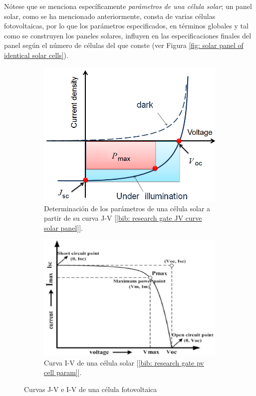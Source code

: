 \documentclass[12pt]{article}
\begin{document}
	\noindent Nótese que se menciona específicamente \textit{parámetros de una célula solar}; un panel solar, como se ha mencionado anteriormente, consta de varias células fotovoltaicas, por lo que los parámetros especificados, en términos globales y tal como se construyen los paneles solares, influyen en las especificaciones finales del panel según el número de células del que conste (ver Figura \ref{fig: solar panel of identical solar cells}). \\
		\begin{figure}[h]
		\begin{subfigure}{0.5\textwidth}
			\includegraphics[width=1\textwidth]{img/JV_curve_solarCell.png} 
			\caption{Determinación de los parámetros de una célula solar a partir de su curva J-V [\ref{bib: research gate JV curve solar panel}].}
			\label{fig: curva J-V célula solar}
		\end{subfigure}
		\begin{subfigure}{0.5\textwidth}
			\includegraphics[width=1\linewidth]{img/IV_curve_solarCell.png}
			\caption{Curva I-V de una célula solar [\ref{bib: research gate pv cell param}].}
			\label{fig: I-V curve of a solar cell}
		\end{subfigure}
		\caption{Curvas J-V e I-V de una célula fotovoltaica}
		\label{fig:curvas J-V e I-V célula PV}
	\end{figure}
\end{document}
